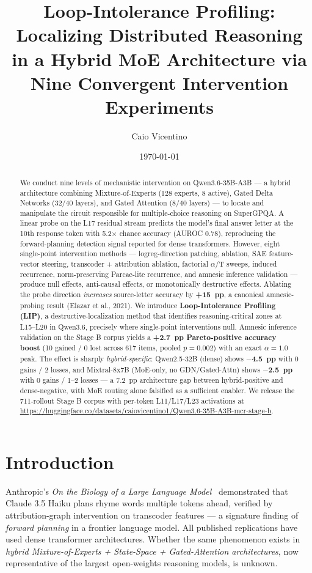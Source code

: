 \documentclass[11pt]{article}
\title{Loop-Intolerance Profiling: Localizing Distributed Reasoning in a Hybrid MoE Architecture via Nine Convergent Intervention Experiments}
\author[1]{Caio Vicentino}
\affil[1]{Independent Researcher \\ \texttt{satoshimemes79@gmail.com}}
\date{\today}
\begin{document}
\maketitle

\begin{abstract}
We conduct nine levels of mechanistic intervention on Qwen3.6-35B-A3B --- a hybrid architecture combining Mixture-of-Experts (128 experts, 8 active), Gated Delta Networks (32/40 layers), and Gated Attention (8/40 layers) --- to locate and manipulate the circuit responsible for multiple-choice reasoning on SuperGPQA. A linear probe on the L17 residual stream predicts the model's final answer letter at the 10th response token with 5.2$\times$ chance accuracy (AUROC 0.78), reproducing the forward-planning detection signal reported for dense transformers. However, eight single-point intervention methods --- logreg-direction patching, ablation, SAE feature-vector steering, transcoder + attribution ablation, factorial $\alpha$/T sweeps, induced recurrence, norm-preserving Parcae-lite recurrence, and amnesic inference validation --- produce null effects, anti-causal effects, or monotonically destructive effects. Ablating the probe direction \emph{increases} source-letter accuracy by \textbf{+15~pp}, a canonical amnesic-probing result (Elazar et al., 2021). We introduce \textbf{Loop-Intolerance Profiling (LIP)}, a destructive-localization method that identifies reasoning-critical zones at L15--L20 in Qwen3.6, precisely where single-point interventions null. Amnesic inference validation on the Stage B corpus yields a \textbf{+2.7~pp Pareto-positive accuracy boost} (10 gained / 0 lost across 617 items, pooled $p=0.002$) with an exact $\alpha=1.0$ peak. The effect is sharply \emph{hybrid-specific}: Qwen2.5-32B (dense) shows \textbf{$-$4.5~pp} with 0 gains / 2 losses, and Mixtral-8x7B (MoE-only, no GDN/Gated-Attn) shows \textbf{$-$2.5~pp} with 0 gains / 1--2 losses --- a 7.2~pp architecture gap between hybrid-positive and dense-negative, with MoE routing alone falsified as a sufficient enabler. We release the 711-rollout Stage B corpus with per-token L11/L17/L23 activations at \url{https://huggingface.co/datasets/caiovicentino1/Qwen3.6-35B-A3B-mcr-stage-b}.
\end{abstract}

\section{Introduction}

Anthropic's \emph{On the Biology of a Large Language Model}~\cite{lindsey2025biology} demonstrated that Claude 3.5 Haiku plans rhyme words multiple tokens ahead, verified by attribution-graph intervention on transcoder features --- a signature finding of \emph{forward planning} in a frontier language model. All published replications have used dense transformer architectures. Whether the same phenomenon exists in \emph{hybrid Mixture-of-Experts + State-Space + Gated-Attention architectures}, now representative of the largest open-weights reasoning models, is unknown.
\end{document}
